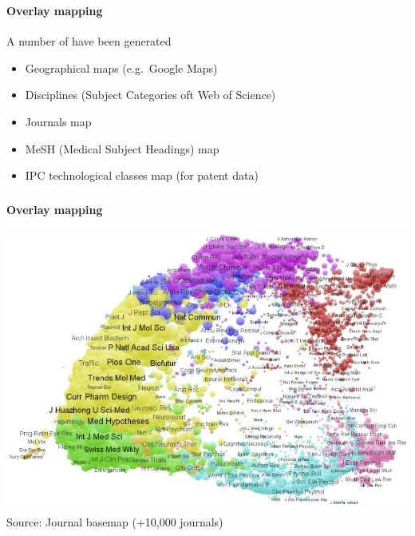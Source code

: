 \documentclass[8pt]{beamer}
\begin{document}


\begin{frame}
\frametitle{\insertsection}
\framesubtitle{Overlay mapping}

A number of {\color{blue}{basemaps}} have been generated \cite{Rotolo2017}
\begin{itemize}
\item Geographical maps (e.g.\ Google Maps)
\item Disciplines (Subject Categories oft Web of Science)
\item Journals map
\item MeSH (Medical Subject Headings) map
\item IPC technological classes map (for patent data)
\end{itemize}

\end{frame}


\begin{frame}
\frametitle{\insertsection}
\framesubtitle{Overlay mapping}

\centering
\includegraphics[width=\linewidth,height=0.75\textheight,keepaspectratio]{journals}\\
\tiny{Source: Journal basemap (+10,000 journals)  \cite{Leydesdorff2012b}}

\end{frame}

\end{document}

